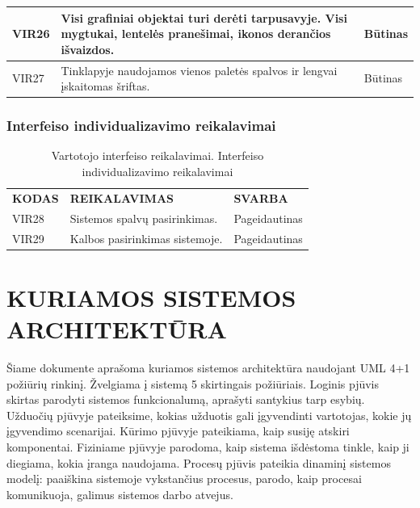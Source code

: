 \documentclass{VUMIFPSkursinis}
\begin{document}
\begin{table}[H]
\centering
\normalsize
\begin{tabular}{|p{2cm}|p{10cm}|p{3cm}|}
\hline
VIR26 & \multicolumn{1}{m{10cm}|}{Visi grafiniai objektai turi derėti tarpusavyje. Visi mygtukai, lentelės pranešimai, ikonos derančios išvaizdos.} & Būtinas \\ \hline
VIR27 & \multicolumn{1}{m{10cm}|}{Tinklapyje naudojamos vienos paletės spalvos ir lengvai įskaitomas šriftas.} & Būtinas \\ \hline
\end{tabular}
\end{table}

\subsubsection{Interfeiso individualizavimo reikalavimai}
\begin{table}[H]
\caption{Vartotojo interfeiso reikalavimai. Interfeiso individualizavimo reikalavimai}
\centering
\normalsize
\begin{tabular}{|p{2cm}|p{10cm}|p{3cm}|}
\hline
\rowcolor{gray!30}
\multicolumn{3}{|l|}{\textbf{7.	Interfeiso individualizavimo reikalavimai}} \\ \hline
\textbf{KODAS}& \multicolumn{1}{m{10cm}|}{\textbf{REIKALAVIMAS}} & \textbf{SVARBA} \\ \hline
VIR28 & \multicolumn{1}{m{10cm}|}{Sistemos spalvų pasirinkimas.} & Pageidautinas \\ \hline
VIR29 & \multicolumn{1}{m{10cm}|}{Kalbos pasirinkimas sistemoje.} & Pageidautinas \\ \hline
\end{tabular}
\end{table}

\section{KURIAMOS SISTEMOS ARCHITEKTŪRA}
Šiame dokumente aprašoma kuriamos sistemos architektūra naudojant UML 4+1 požiūrių rinkinį. Žvelgiama į sistemą 5 skirtingais požiūriais. Loginis pjūvis skirtas parodyti sistemos funkcionalumą, aprašyti santykius tarp esybių. Užduočių pjūvyje pateiksime, kokias užduotis gali įgyvendinti vartotojas, kokie jų įgyvendimo scenarijai.  Kūrimo pjūvyje pateikiama, kaip susiję atskiri komponentai. Fiziniame pjūvyje parodoma, kaip sistema išdėstoma tinkle, kaip ji diegiama, kokia įranga naudojama. Procesų pjūvis pateikia dinaminį sistemos modelį: paaiškina sistemoje vykstančius procesus, parodo, kaip procesai komunikuoja, galimus sistemos darbo atvejus.
\end{document}
